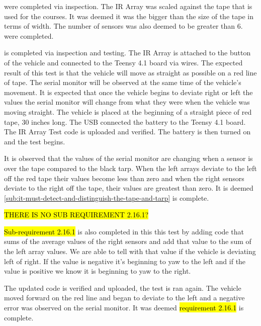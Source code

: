 \documentclass[11pt]{report}
\begin{document}
\label{tst:ir-array-observation}
 were completed via inspection. The \gls{IR} Array was scaled against the tape that is used for the courses. It was deemed it was the bigger than the size of the tape in terms of width. The number of sensors was also deemed to be greater than 6.  were completed. 

\label{tst:ir-array-detection}
 is completed via inspection and testing. The \gls{IR} Array is attached to the button of the vehicle and connected to the Teensy 4.1 board via wires. The expected result of this test is that the vehicle will move as straight as possible on a red line of tape. The serial monitor will be observed at the same time of the vehicle’s movement. It is expected that once the vehicle begins to deviate right or left the values the serial monitor will change from what they were when the vehicle was moving straight. The vehicle is placed at the beginning of a straight piece of red tape, 30 inches long. The USB connected the battery to the Teensy 4.1 board. The \gls{IR} Array Test code is uploaded and verified. The battery is then turned on and the test begins. 

It is observed that the values of the serial monitor are changing when a sensor is over the tape compared to the black tarp. When the left arrays deviate to the left off the red tape their values become less than zero and when the right sensors deviate to the right off the tape, their values are greatest than zero. It is deemed \cref{sub:it-must-detect-and-distinguish-the-tape-and-tarp} is complete. 

\hl{THERE IS NO SUB REQUIREMENT 2.16.1?}

\hl{Sub-requirement 2.16.1} is also completed in this this test by adding code that sums of the average values of the right sensors and add that value to the sum of the left array values. We are able to tell with that value if the vehicle is deviating left of right. If the value is negative it’s beginning to yaw to the left and if the value is positive we know it is beginning to yaw to the right. 

The updated code is verified and uploaded, the test is ran again. The vehicle moved forward on the red line and began to deviate to the left and a negative error was observed on the serial monitor. It was deemed \hl{requirement 2.16.1} is complete. 
\end{document}
